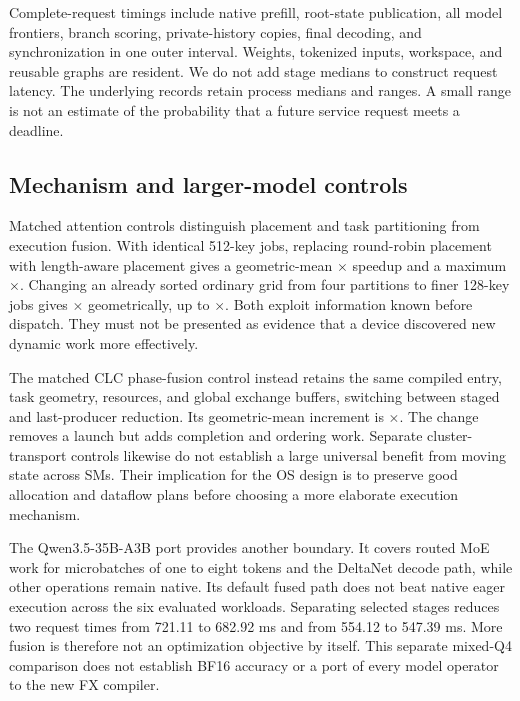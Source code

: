 Complete-request timings include native prefill, root-state publication,
all model frontiers, branch scoring, private-history copies, final decoding,
and synchronization in one outer interval. Weights, tokenized inputs,
workspace, and reusable graphs are resident. We do not add stage medians
to construct request latency. The underlying records retain process medians and ranges. A small range is
not an estimate of
the probability that a future service request meets a deadline.



\subsection{Mechanism and larger-model controls}
Matched attention controls distinguish placement and task partitioning from
execution fusion. With identical 512-key jobs, replacing round-robin placement
with length-aware placement gives a geometric-mean
$\times$ speedup and a maximum
$\times$. Changing an already sorted ordinary grid from
four partitions to finer 128-key jobs gives $\times$
geometrically, up to $\times$. Both exploit information
known before dispatch. They must not be presented as evidence that a device
discovered new dynamic work more effectively.

The matched CLC phase-fusion control instead retains the same compiled entry,
task geometry, resources, and global exchange buffers, switching between
staged and last-producer reduction. Its geometric-mean increment is
$\times$. The change removes a launch but adds completion
and ordering work. Separate cluster-transport controls likewise do not
establish a large universal benefit from moving state across SMs. Their
implication for the OS design is to preserve good allocation and dataflow
plans before choosing a more elaborate execution mechanism.

The Qwen3.5-35B-A3B port provides another boundary. It covers routed MoE
work for microbatches of one to eight tokens and the DeltaNet decode path,
while other operations remain native. Its default fused path does not beat
native eager execution across the six evaluated workloads. Separating
selected stages reduces two request times from 721.11 to 682.92 ms and
from 554.12 to 547.39 ms. More fusion is therefore not an optimization
objective by itself. This separate mixed-Q4 comparison does not establish
BF16 accuracy or a port of every model operator to the new FX compiler.

